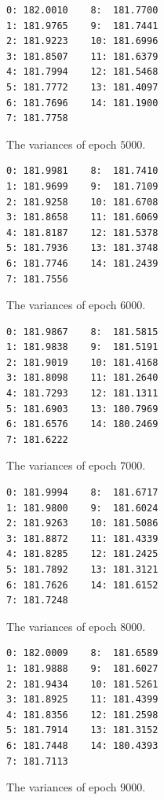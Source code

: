 \documentclass[a4paper, 10pt, notitlepage, twocolumn]{article}
\begin{document}
\begin{figure}[!ht]
 \begin{verbatim}
0: 182.0010    8:  181.7700
1: 181.9765    9:  181.7441
2: 181.9223    10: 181.6996
3: 181.8507    11: 181.6379
4: 181.7994    12: 181.5468
5: 181.7772    13: 181.4097
6: 181.7696    14: 181.1900
7: 181.7758
 \end{verbatim}
 \vspace{-20pt} 
 \caption{The variances of epoch $5000$.}
\end{figure}

\begin{figure}[!ht]
 \begin{verbatim}
0: 181.9981    8:  181.7410
1: 181.9699    9:  181.7109
2: 181.9258    10: 181.6708
3: 181.8658    11: 181.6069
4: 181.8187    12: 181.5378
5: 181.7936    13: 181.3748
6: 181.7746    14: 181.2439
7: 181.7556
 \end{verbatim}
 \vspace{-20pt} 
 \caption{The variances of epoch $6000$.}
\end{figure}

\begin{figure}[!ht]
 \begin{verbatim}
0: 181.9867    8:  181.5815
1: 181.9838    9:  181.5191
2: 181.9019    10: 181.4168
3: 181.8098    11: 181.2640
4: 181.7293    12: 181.1311
5: 181.6903    13: 180.7969
6: 181.6576    14: 180.2469
7: 181.6222
 \end{verbatim}
 \vspace{-20pt} 
 \caption{The variances of epoch $7000$.}
\end{figure}

\begin{figure}[!ht]
 \begin{verbatim}
0: 181.9994    8:  181.6717
1: 181.9800    9:  181.6024
2: 181.9263    10: 181.5086
3: 181.8872    11: 181.4339
4: 181.8285    12: 181.2425
5: 181.7892    13: 181.3121
6: 181.7626    14: 181.6152
7: 181.7248
 \end{verbatim}
 \vspace{-20pt} 
 \caption{The variances of epoch $8000$.}
\end{figure}

\begin{figure}[!ht]
 \begin{verbatim}
0: 182.0009    8:  181.6589
1: 181.9888    9:  181.6027
2: 181.9434    10: 181.5261
3: 181.8925    11: 181.4399
4: 181.8356    12: 181.2598
5: 181.7914    13: 181.3152
6: 181.7448    14: 180.4393
7: 181.7113
 \end{verbatim}
 \vspace{-20pt} 
 \caption{The variances of epoch $9000$.}
\end{figure}
 
\end{document}
